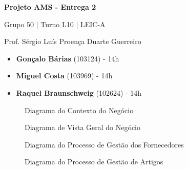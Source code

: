\documentclass[12pt,a4paper]{article}
\begin{document}
\begin{titlepage}
  \begin{center}
    \vspace*{5cm}
    \Huge
    \textbf{Projeto AMS - Entrega 2}

    \vspace{0.5cm}
    \LARGE
    Grupo 50 | Turno L10 | LEIC-A

    \vspace{0.5cm}
    \large
    Prof. Sérgio Luís Proença Duarte Guerreiro

    \vfill
    \large
    \begin{minipage}{0.8\textwidth}
      \begin{itemize}
        \item[] \textbf{Gonçalo Bárias} (103124) - 14h
        \item[] \textbf{Miguel Costa} (103969) - 14h
        \item[] \textbf{Raquel Braunschweig} (102624) - 14h
      \end{itemize}
    \end{minipage}
  \end{center}
\end{titlepage}

\begin{landscape}
  \begin{figure}
    \centering
    
    \caption{Diagrama do Contexto do Negócio}
    \label{fig:a1-fixed}
  \end{figure}
\end{landscape}

\begin{landscape}
  \begin{figure}
    \centering
    
    \caption{Diagrama de Vista Geral do Negócio}
    \label{fig:a2-fixed}
  \end{figure}
\end{landscape}

\begin{landscape}
  \begin{figure}
    \centering
    
    \caption{Diagrama do Processo de Gestão dos Fornecedores}
    \label{fig:p1-fixed}
  \end{figure}
\end{landscape}

\begin{landscape}
  \begin{figure}
    \centering
    
    \caption{Diagrama do Processo de Gestão de Artigos}
    \label{fig:p2-fixed}
  \end{figure}
\end{landscape}
\end{document}
